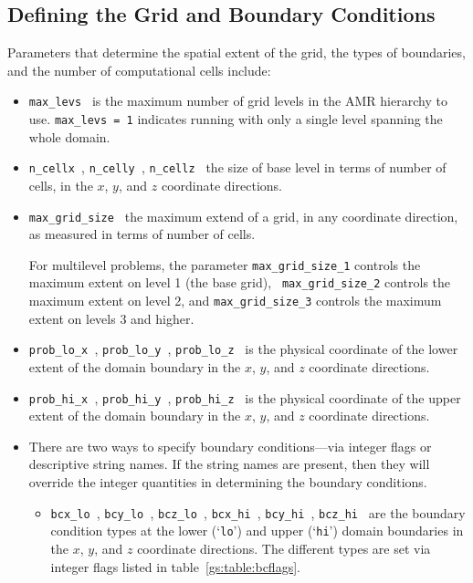 \subsection{Defining the Grid and Boundary Conditions}

Parameters that determine the spatial extent of the grid, 
the types of boundaries, and the number of computational cells include:
\begin{itemize}

\item {\tt max\_levs } is the maximum number of grid levels in the AMR
  hierarchy to use.  {\tt max\_levs = 1} indicates running with only a
  single level spanning the whole domain.

\item {\tt n\_cellx }, {\tt n\_celly }, {\tt n\_cellz } the size of
  base level in terms of number of cells, in the $x$, $y$, and $z$
  coordinate directions.

\item {\tt max\_grid\_size } the maximum extend of a grid, in any
  coordinate direction, as measured in terms of number of cells.

  For multilevel problems, the parameter {\tt max\_grid\_size\_1}
  controls the maximum extent on level 1 (the base grid), {\tt
    max\_grid\_size\_2} controls the maximum extent on level 2, and
  {\tt max\_grid\_size\_3} controls the maximum extent on levels 3 and
  higher.

\item {\tt prob\_lo\_x }, {\tt prob\_lo\_y }, {\tt prob\_lo\_z } is
  the physical coordinate of the lower extent of the domain boundary
  in the $x$, $y$, and $z$ coordinate directions.

\item {\tt prob\_hi\_x }, {\tt prob\_hi\_y }, {\tt prob\_hi\_z } is
  the physical coordinate of the upper extent of the domain boundary
  in the $x$, $y$, and $z$ coordinate directions.

\item There are two ways to specify boundary conditions---via integer flags
      or descriptive string names.  If the string names are present,
      then they will override the integer quantities in determining
      the boundary conditions.

   \begin{itemize}

   \item {\tt bcx\_lo }, {\tt bcy\_lo }, {\tt bcz\_lo }, {\tt bcx\_hi
      }, {\tt bcy\_hi }, {\tt bcz\_hi } are the boundary condition
      types at the lower (`{\tt lo}') and upper (`{\tt hi}') domain
      boundaries in the $x$, $y$, and $z$ coordinate directions.  The
      different types are set via integer flags listed in
      table~\ref{gs:table:bcflags}.


\end{itemize}
\end{itemize}

